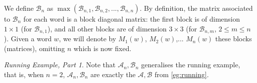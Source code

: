 \documentclass[10pt,a4paper]{amsart}
\theoremstyle{definition}
\numberwithin{equation}{section}
\theoremstyle{remark}
\newcommand{\autB}{\mathcal{B}}
\theoremstyle{remark}
\newtheorem{runningexample/}{Running Example, Part}
\newenvironment{runningexample}
  {\renewcommand{\qedsymbol}{\color{darkgray}\ensuremath{\lrcorner}}%
   \pushQED{\qed}\begin{runningexample/}}
  {\popQED\end{runningexample/}}
\begin{document}
We define $\mathcal{B}_n$ as $\max(\mathcal{B}_{n,1}, \mathcal{B}_{n,2}, ..., \mathcal{B}_{n,n})$. By definition, the matrix associated to $\mathcal{B}_n$ for each word is a block diagonal matrix: the first block is of dimension $1 \times 1$ (for $\autB_{n,1}$), and all other blocks are of dimension $3\times 3$ (for $\autB_{n,m}$, $2 \leq m \leq n$). Given a word $w$, we will denote by $M_1(w)$, $M_2(w)$,... $M_n(w)$ these blocks (matrices), omitting $n$ which is now fixed.  

\begin{runningexample}
Note that $\mathcal{A}_n,\mathcal{B}_n$ generalises the running example, that is, when $n = 2$, $\mathcal{A}_n,\mathcal{B}_n$ are exactly the $\mathcal{A},\mathcal{B}$ from \cref{eg:running}. 
\end{runningexample}
\end{document}
